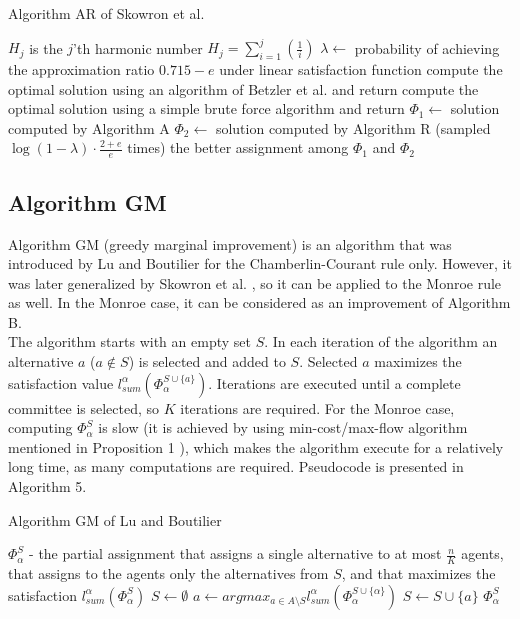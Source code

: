 \begin{algorithm}
\caption{Algorithm AR of Skowron et al. \cite{1}}\label{euclid}
\begin{algorithmic}[1]
		\State $H_{j}$ is the $j$'th harmonic number $H_{j} = \sum_{i=1}^{j}(\frac{1}{i})$
		\State $\lambda \gets$ probability of achieving the approximation ratio $0.715 - e$ under linear satisfaction function
			\State compute the optimal solution using an algorithm of Betzler et al. \cite{3} and return
		\EndIf
			\State compute the optimal solution using a simple brute force algorithm and return
		\EndIf
		\State $\Phi_{1} \gets$ solution computed by Algorithm A
		\State $\Phi_{2} \gets$ solution computed by Algorithm R (sampled $\log (1 - \lambda) \cdot \frac{2 + e}{e}$ times)
		\State \Return the better assignment among $\Phi_{1}$ and $\Phi_{2}$
	\EndProcedure
\end{algorithmic}
\end{algorithm}

\subsection{Algorithm GM}

Algorithm GM (greedy marginal improvement) is an algorithm that was introduced by Lu and Boutilier \cite{4} for the Chamberlin-Courant rule only. However, it was later generalized by Skowron et al. \cite{1}, so it can be applied to the Monroe rule as well. In the Monroe case, it can be considered as an improvement of Algorithm B.
\\

The algorithm starts with an empty set $S$. In each iteration of the algorithm an alternative $a$ ($a \notin S$) is selected and added to $S$. Selected $a$ maximizes the satisfaction value $l_{sum}^{\alpha}(\Phi^{S \cup \{a\}}_{\alpha})$. Iterations are executed until a complete committee is selected, so $K$ iterations are required. For the Monroe case, computing $\Phi^{S}_{\alpha}$ is slow (it is achieved by using min-cost/max-flow algorithm mentioned in Proposition 1 \cite{3}), which makes the algorithm execute for a relatively long time, as many computations are required. Pseudocode is presented in Algorithm 5.
\\

\begin{algorithm}
\caption{Algorithm GM of Lu and Boutilier \cite{4}}\label{euclid}
\begin{algorithmic}[1]
		\State $\Phi^{S}_{\alpha}$ - the partial assignment that assigns a single alternative to at most $\frac{n}{K}$ agents, that assigns to the agents only the alternatives from $S$, and that maximizes the satisfaction $l^{\alpha}_{sum}(\Phi^{S}_{\alpha})$
		\State $S \gets \emptyset$
			\State $a \gets argmax_{a \in A \setminus S} l^{\alpha}_{sum} (\Phi^{S \cup \{\alpha\}}_{\alpha})$
			\State $S \gets S \cup \{a\}$
		\EndFor
		\State \Return $\Phi^{S}_{\alpha}$
	\EndProcedure
\end{algorithmic}
\end{algorithm}


